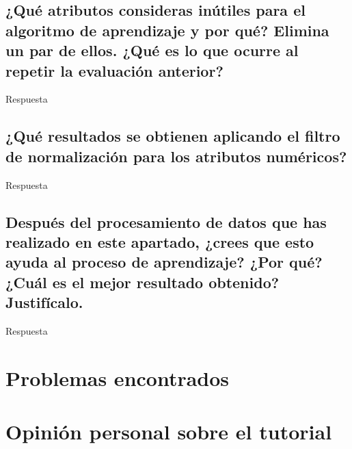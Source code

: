 \documentclass[12pt]{article}
\begin{document}
\subsection*{\small ¿Qué atributos consideras inútiles para el algoritmo de
aprendizaje y por qué? Elimina un par de ellos. ¿Qué es lo que ocurre al
repetir la evaluación anterior?}

Respuesta

\subsection*{\small ¿Qué resultados se obtienen aplicando el filtro de
normalización para los atributos numéricos?}

Respuesta

\subsection*{\small Después del procesamiento de datos que has realizado en este
apartado, ¿crees que esto ayuda al proceso de aprendizaje? ¿Por qué? ¿Cuál es
el mejor resultado obtenido? Justifícalo.}

Respuesta

\section{Problemas encontrados}
\section{Opinión personal sobre el tutorial}
\end{document}
